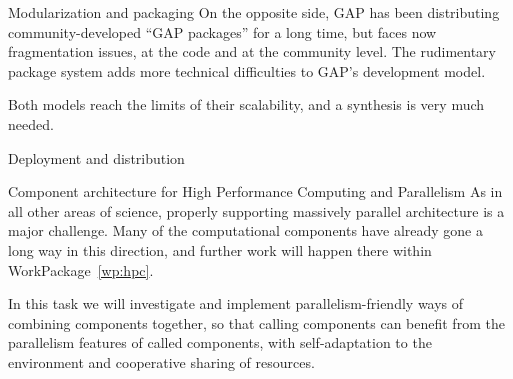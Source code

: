 \begin{Workpackage}{\thewpno}
\begin{task}{Modularization and packaging}
    On the opposite side, GAP has been distributing
    community-developed ``GAP packages'' for a long time, but faces
    now fragmentation issues, at the code and at the community
    level. The rudimentary package system adds more technical
    difficulties to GAP's development model.

    Both models reach the limits of their scalability, and a synthesis
    is very much needed.
  \end{task}
  
  \begin{task}{Deployment and distribution}
  \end{task}

  \begin{task}{Component architecture for High Performance Computing and Parallelism}
    As in all other areas of science, properly supporting massively
    parallel architecture is a major challenge. Many of the
    computational components have already gone a long way in this
    direction, and further work will happen there within
    WorkPackage~\ref{wp:hpc}.

    In this task we will investigate and implement
    parallelism-friendly ways of combining components together, so
    that calling components can benefit from the parallelism features
    of called components, with self-adaptation to the environment and
    cooperative sharing of resources.
  \end{task}

  \begin{WPDeliverables}



\end{WPDeliverables}
\end{Workpackage}
